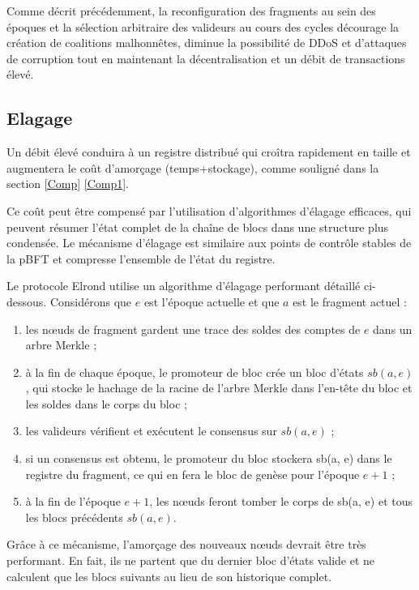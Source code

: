 \documentclass[journal]{IEEEtran}
\begin{document}
Comme décrit précédemment, la reconfiguration des fragments au sein des époques et la sélection arbitraire des valideurs au cours des cycles décourage la création de coalitions malhonnêtes, diminue la possibilité de DDoS et d'attaques de corruption tout en maintenant la décentralisation et un débit de transactions élevé. 

\subsection{Elagage} 
\label{Amor2}
Un débit élevé conduira à un registre distribué qui croîtra rapidement en taille et augmentera le coût d'amorçage (temps+stockage), comme souligné dans la section \ref{Comp} \ref{Comp1}.

Ce coût peut être compensé par l'utilisation d'algorithmes d'élagage efficaces, qui peuvent résumer l'état complet de la chaîne  de blocs dans une structure plus condensée. Le mécanisme d'élagage est similaire aux points de contrôle stables de la pBFT \cite{15} et compresse l'ensemble de l'état du registre.

Le protocole Elrond utilise un algorithme d'élagage performant \cite{7} détaillé ci-dessous. Considérons que $e$ est l'époque actuelle et que $a$ est le fragment actuel :
\begin{enumerate}
  \item  les nœuds de fragment gardent une trace des soldes des comptes de $e$ dans un arbre Merkle \cite{44} ;
  \item à la fin de chaque époque, le promoteur de bloc crée un bloc d'états $sb(a, e)$, qui stocke le hachage de la racine de l'arbre Merkle dans l'en-tête du bloc et les soldes dans le corps du bloc ;
  \item les valideurs vérifient et exécutent le consensus sur $sb(a, e)$ ;
  \item si un consensus est obtenu, le promoteur du bloc stockera sb(a, e) dans le registre du fragment, ce qui en fera le bloc de genèse pour l'époque $e+1$ ;
  \item à la fin de l'époque $e+1$, les nœuds feront tomber le corps de sb(a, e) et tous les blocs précédents $sb(a, e)$.
\end{enumerate}

Grâce à ce mécanisme, l'amorçage des nouveaux nœuds devrait être très performant. En fait, ils ne partent que du dernier bloc d'états valide et ne calculent que les blocs suivants au lieu de son historique complet.


\end{document}

